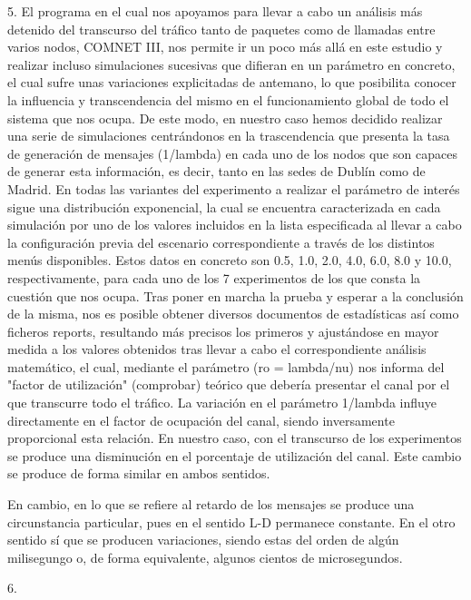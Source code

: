 5.
El programa en el cual nos apoyamos para llevar a cabo un análisis más detenido del transcurso del tráfico tanto de paquetes como de llamadas entre varios nodos, COMNET III, nos permite ir un poco más allá en este estudio y realizar incluso simulaciones sucesivas que difieran en un parámetro en concreto, el cual sufre unas variaciones explicitadas de antemano, lo que posibilita conocer la influencia y transcendencia del mismo en el funcionamiento global de todo el sistema que nos ocupa. De este modo, en nuestro caso hemos decidido realizar una serie de simulaciones centrándonos en la trascendencia que presenta la tasa de generación de mensajes (1/lambda) en cada uno de los nodos que son capaces de generar esta información, es decir, tanto en las sedes de Dublín como de Madrid. En todas las variantes del experimento a realizar el parámetro de interés sigue una distribución exponencial, la cual se encuentra caracterizada en cada simulación por uno de los valores incluidos en la lista especificada al llevar a cabo la configuración previa del escenario correspondiente a través de los distintos menús disponibles. Estos datos en concreto son 0.5, 1.0, 2.0, 4.0, 6.0, 8.0 y 10.0, respectivamente, para cada uno de los 7 experimentos de los que consta la cuestión que nos ocupa. Tras poner en marcha la prueba y esperar a la conclusión de la misma, nos es posible obtener diversos documentos de estadísticas así como ficheros reports, resultando más precisos los primeros y ajustándose en mayor medida a los valores obtenidos tras llevar a cabo el correspondiente análisis matemático, el cual, mediante el parámetro (ro = lambda/nu) nos informa del "factor de utilización" (comprobar) teórico que debería presentar el canal por el que transcurre todo el tráfico. La variación en el parámetro 1/lambda influye directamente en el factor de ocupación del canal, siendo inversamente proporcional esta relación. En nuestro caso, con el transcurso de los experimentos se produce una disminución en el porcentaje de utilización del canal. Este cambio se produce de forma similar en ambos sentidos.

En cambio, en lo que se refiere al retardo de los mensajes se produce una circunstancia particular, pues en el sentido L-D permanece constante. En el otro sentido sí que se producen variaciones, siendo estas del orden de algún milisegungo o, de forma equivalente, algunos cientos de microsegundos.

6.
